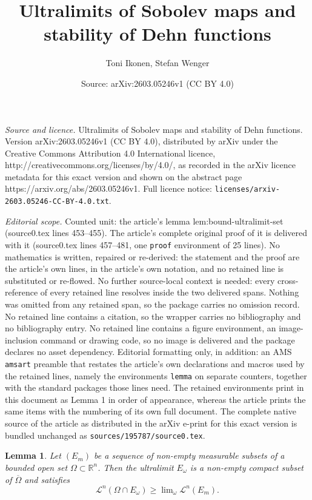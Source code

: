\documentclass[10pt,a4paper]{amsart}
\title{Ultralimits of Sobolev maps and stability of Dehn functions}
\author{Toni Ikonen, Stefan Wenger}
\date{Source: arXiv:2603.05246v1 (CC BY 4.0)}
\newtheorem{lemma}{Lemma}
\newcommand{\R}{\mathbb{R}}
\newcommand{\lm}{\mathscr{L}}
\begin{document}
\maketitle

\noindent\emph{Source and licence.} Ultralimits of Sobolev maps and stability of Dehn functions. Version arXiv:2603.05246v1 (CC BY 4.0), distributed by arXiv under the Creative Commons Attribution 4.0 International licence, http://creativecommons.org/licenses/by/4.0/, as recorded in the arXiv licence metadata for this exact version and shown on the abstract page https://arxiv.org/abs/2603.05246v1. Full licence notice: \texttt{licenses/arxiv-2603.05246-CC-BY-4.0.txt}.\par\smallskip

\noindent\textit{Editorial scope.} Counted unit: the article's lemma lem:bound-ultralimit-set (source0.tex lines 453--455). The article's complete original proof of it is delivered with it (source0.tex lines 457--481, one \texttt{proof} environment of 25 lines). No mathematics is written, repaired or re-derived: the statement and the proof are the article's own lines, in the article's own notation, and no retained line is substituted or re-flowed.  No further source-local context is needed: every cross-reference of every retained line resolves inside the two delivered spans.  Nothing was omitted from any retained span, so the package carries no omission record.  No retained line contains a citation, so the wrapper carries no bibliography and no bibliography entry.  No retained line contains a figure environment, an image-inclusion command or drawing code, so no image is delivered and the package declares no asset dependency.  Editorial formatting only, in addition: an AMS \texttt{amsart} preamble that restates the article's own declarations and macros used by the retained lines, namely the environments \texttt{lemma} on separate counters, together with the standard packages those lines need.  The retained environments print in this document as Lemma 1 in order of appearance, whereas the article prints the same items with the numbering of its own full document.  The complete native source of the article as distributed in the arXiv e-print for this exact version is bundled unchanged as \texttt{sources/195787/source0.tex}.
\begin{lemma}\label{lem:bound-ultralimit-set}
Let $(E_m)$ be a sequence of non-empty measurable subsets of a bounded open set $\Omega \subset \R^n$. Then the ultralimit $E_\omega$ is a non-empty compact subset of $\overline{\Omega}$ and satisfies $$\lm^n(\Omega\cap E_\omega) \geq \lim\nolimits_\omega \lm^n(E_m).$$
\end{lemma}
\end{document}
